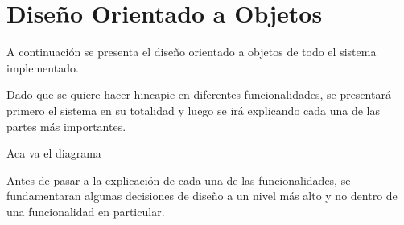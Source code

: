 \section{Dise\~{n}o Orientado a Objetos}

A continuaci\'on se presenta el diseño orientado a objetos de todo el sistema implementado.

Dado que se quiere hacer hincapie en diferentes funcionalidades, se presentar\'a primero el sistema en su totalidad y luego se ir\'a explicando cada una de las partes m\'as importantes.


\bigskip
Aca va el diagrama
\bigskip


Antes de pasar a la explicaci\'on de cada una de las funcionalidades, se fundamentaran algunas decisiones de dise\~{n}o a un nivel m\'as alto y no dentro de una funcionalidad en particular.


